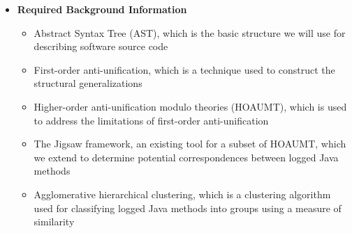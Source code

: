 \documentclass{article}
\newcommand{\bld}{\textbf}
\begin{document}
\begin{itemize} [leftmargin=.1in]
\item \bld{Required Background Information}  
\begin{itemize}
\item Abstract Syntax Tree (AST), which is the basic structure we will use for describing software source code
\item First-order anti-unification, which is a technique used to construct the structural generalizations%
\item Higher-order anti-unification modulo theories (HOAUMT), which is used to address the limitations of first-order anti-unification 
\item The Jigsaw framework, an existing tool for a subset of HOAUMT, which we extend to determine potential correspondences between logged Java methods
\item Agglomerative hierarchical clustering, which is a clustering algorithm used for classifying logged Java methods into groups using a measure of similarity
\end{itemize}

\end{itemize}
\end{document}
